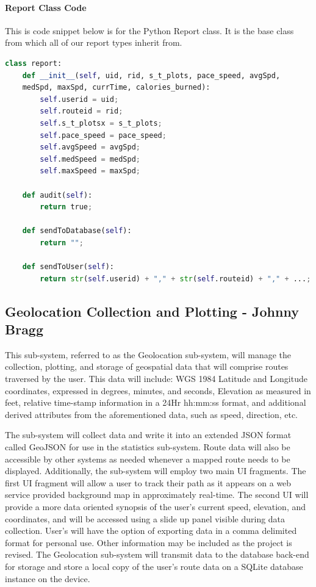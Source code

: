 \documentclass{article}
\begin{document}
\paragraph{Report Class Code}
This is code snippet below is for the Python Report class. It is the base class from which all of our report types inherit from.  
\begin{lstlisting}[language=Python]
class report:
    def __init__(self, uid, rid, s_t_plots, pace_speed, avgSpd, 
    medSpd, maxSpd, currTime, calories_burned):
        self.userid = uid;
        self.routeid = rid;
        self.s_t_plotsx = s_t_plots;
        self.pace_speed = pace_speed;
        self.avgSpeed = avgSpd;
        self.medSpeed = medSpd;
        self.maxSpeed = maxSpd;

    def audit(self):
        return true;

    def sendToDatabase(self):
        return "";

    def sendToUser(self):
        return str(self.userid) + "," + str(self.routeid) + "," + ...;
\end{lstlisting}



\subsection{Geolocation Collection and Plotting - Johnny Bragg}
This sub-system, referred to as the Geolocation sub-system, will manage the collection, plotting, and storage of geospatial data that will comprise routes traversed by the user. This data will include: WGS 1984 Latitude and Longitude coordinates, expressed in degrees, minutes, and seconds, Elevation as measured in feet, relative time-stamp information in a 24Hr hh:mm:ss format, and additional derived attributes from the aforementioned data, such as speed, direction, etc.

The sub-system will collect data and write it into an extended JSON format called GeoJSON for use in the statistics sub-system. Route data will also be accessible by other systems as needed whenever a mapped route needs to be displayed. Additionally, the sub-system will employ two main UI fragments. The first UI fragment will allow a user to track their path as it appears on a web service provided background map in approximately real-time. The second UI will provide a more data oriented synopsis of the user’s current speed, elevation, and coordinates, and will be accessed using a slide up panel visible during data collection. User’s will have the option of exporting data in a comma delimited format for personal use. Other information may be included as the project is revised. The Geolocation sub-system will transmit data to the database back-end for storage and store a local copy of the user's route data on a SQLite database instance on the device.
\end{document}
